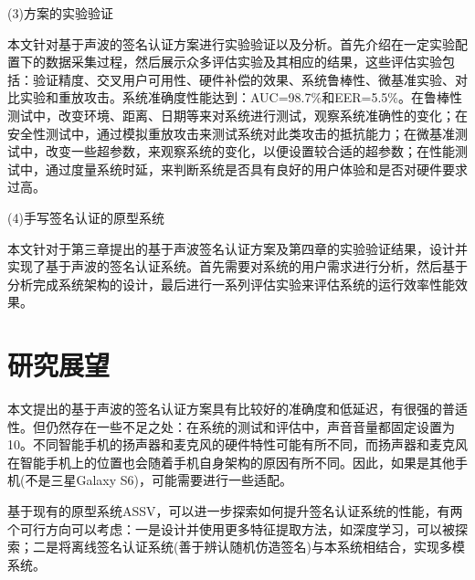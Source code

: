 (3)方案的实验验证

本文针对基于声波的签名认证方案进行实验验证以及分析。首先介绍在一定实验配置下的数据采集过程，然后展示众多评估实验及其相应的结果，这些评估实验包括：验证精度、交叉用户可用性、硬件补偿的效果、系统鲁棒性、微基准实验、对比实验和重放攻击。系统准确度性能达到：AUC=98.7\%和EER=5.5\%。在鲁棒性测试中，改变环境、距离、日期等来对系统进行测试，观察系统准确性的变化；在安全性测试中，通过模拟重放攻击来测试系统对此类攻击的抵抗能力；在微基准测试中，改变一些超参数，来观察系统的变化，以便设置较合适的超参数；在性能测试中，通过度量系统时延，来判断系统是否具有良好的用户体验和是否对硬件要求过高。

(4)手写签名认证的原型系统

本文针对于第三章提出的基于声波签名认证方案及第四章的实验验证结果，设计并实现了基于声波的签名认证系统。首先需要对系统的用户需求进行分析，然后基于分析完成系统架构的设计，最后进行一系列评估实验来评估系统的运行效率性能效果。

\section{研究展望}
本文提出的基于声波的签名认证方案具有比较好的准确度和低延迟，有很强的普适性。但仍然存在一些不足之处：在系统的测试和评估中，声音音量都固定设置为10。不同智能手机的扬声器和麦克风的硬件特性可能有所不同，而扬声器和麦克风在智能手机上的位置也会随着手机自身架构的原因有所不同。因此，如果是其他手机(不是三星Galaxy S6)，可能需要进行一些适配。

基于现有的原型系统ASSV，可以进一步探索如何提升签名认证系统的性能，有两个可行方向可以考虑：一是设计并使用更多特征提取方法，如深度学习，可以被探索；二是将离线签名认证系统(善于辨认随机仿造签名)与本系统相结合，实现多模系统。
